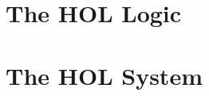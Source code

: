 \documentclass[12pt]{book}
\begin{document}
   \setlength{\unitlength}{1mm}           %
   \setlength{\baselineskip}{16pt}        %


   \setcounter{page}{1}                   %

   \tableofcontents                       %


   \cleardoublepage
   \setcounter{page}{1}                  %


   \part{The HOL Logic \label{HOL-logic}}



   \part{The HOL System \label{HOL-SYS}}


   
   
   
%   
   


\end{document}
